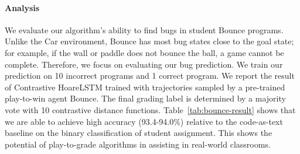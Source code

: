 \documentclass{article}
\newcommand{\EDIT}[1]{#1}%
\begin{document}
\paragraph{Analysis} We evaluate our algorithm's ability to find bugs in student Bounce programs. Unlike the Car environment, Bounce has most bug states close to the goal state; for example, if the wall or paddle does not bounce the ball, a game cannot be complete. Therefore, we focus on evaluating our bug prediction.
We \EDIT{train our prediction on} 10 incorrect programs and 1 correct program. 
We report the result of Contrastive HoareLSTM trained with trajectories sampled by a pre-trained play-to-win agent Bounce. The final grading label is determined by a majority vote with 10 contrastive distance functions. \EDIT{Table~\ref{tab:bounce-result} shows that we are able to achieve high accuracy (93.4-94.0\%) relative to the code-as-text baseline on the binary classification of student assignment.}
This shows the potential of play-to-grade algorithms in assisting in real-world classrooms. 
\end{document}
